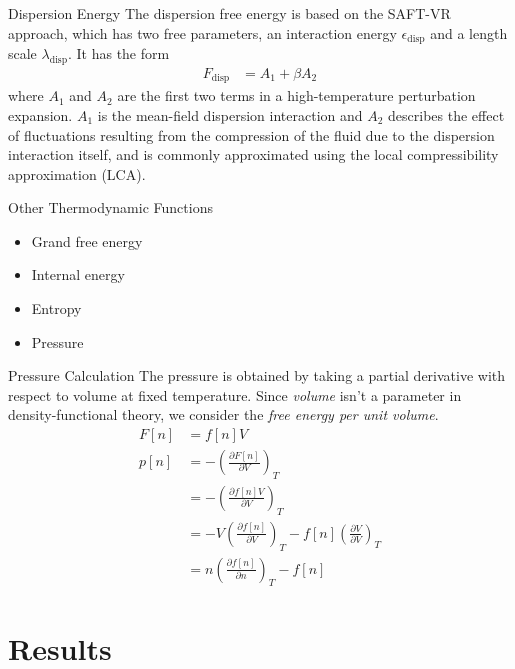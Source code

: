 \documentclass{beamer}
\begin{document}
\begin{frame}[fragile]{Dispersion Energy}
The dispersion free energy is based on the SAFT-VR
approach, which has two free
parameters, an interaction energy $\epsilon_\text{disp}$ and a
length scale $\lambda_\text{disp}$. It has the form
\begin{align}
  F_\text{disp} &= A_1 + \beta A_2
\end{align}
where $A_1$ and $A_2$ are the first two terms in a high-temperature
perturbation expansion.  $A_1$ is the mean-field dispersion
interaction and $A_2$ describes the
effect of fluctuations resulting from the compression of the fluid due
to the dispersion interaction itself, and is commonly approximated
using the local compressibility approximation (LCA).
\end{frame}

\begin{frame}[fragile]{Other Thermodynamic Functions}
\begin{itemize}
 \item Grand free energy
 \item Internal energy
 \item Entropy
 \item Pressure
\end{itemize}
\end{frame}


\begin{frame}[fragile]{Pressure Calculation}
The pressure is obtained by taking a partial
derivative with respect to volume at fixed temperature.  Since
\emph{volume} isn't a parameter in density-functional theory, we
consider the \emph{free energy per unit volume}.
\begin{align}
  F[n] &= f[n]V \\
  p[n] &= -\left(\frac{\partial F[n]}{\partial V}\right)_{T} \\
  &= -\left(\frac{\partial f[n]V}{\partial V}\right)_{T} \\
  &= -V\left(\frac{\partial f[n]}{\partial V}\right)_{T}
   - f[n]\left(\frac{\partial V}{\partial V}\right)_{T} \\
  &= n \left(\frac{\partial f[n]}{\partial n}\right)_{T} - f[n]
\end{align}
\end{frame}

\section{Results}
\subsection*{}
\end{document}
